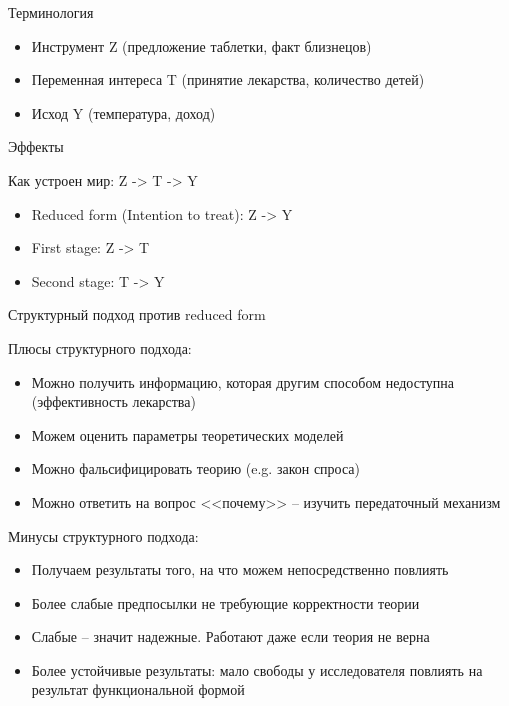 \begin{frame}{Терминология}
\begin{itemize}
    \item Инструмент Z (предложение таблетки, факт близнецов)
    \item Переменная интереса T (принятие лекарства, количество детей)
    \item Исход Y (температура, доход)
\end{itemize}
\end{frame}


\begin{frame}{Эффекты}

Как устроен мир: Z -> T -> Y

\begin{itemize}[<+->]
    \item Reduced form (Intention to treat): Z -> Y
    \item First stage: Z -> T
    \item Second stage: T -> Y
\end{itemize}

\end{frame}



\begin{frame}{Структурный подход против reduced form}

Плюсы структурного подхода:
\begin{itemize}
    \item Можно получить информацию, которая другим способом недоступна (эффективность лекарства)
    \item Можем оценить параметры теоретических моделей
    \item Можно фальсифицировать теорию (e.g. закон спроса)
    \item Можно ответить на вопрос <<почему>> -- изучить передаточный механизм
\end{itemize}

Минусы структурного подхода:
\begin{itemize}
    \item Получаем результаты того, на что можем непосредственно повлиять
    \item Более слабые предпосылки не требующие корректности теории
    \item Слабые -- значит надежные. Работают даже если теория не верна
    \item Более устойчивые результаты: мало свободы у исследователя повлиять на результат функциональной формой
\end{itemize}
    
\end{frame}


